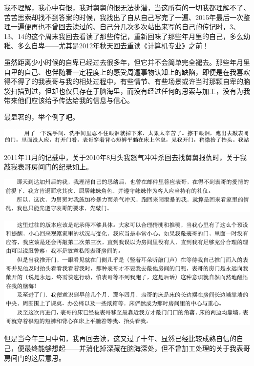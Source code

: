 \documentclass[9pt, b5paper]{article}
\begin{document}
我不理解，我心中有恨，我对舅舅的恨无法排潜，当这所有的一切我都理解不了、苦苦思索却找不到答案的时候，我找出了自从自己写完了一遍、2015年最后一次整理一遍便再也不曾回去读过的、自己分几次多次站出来写的自己的传记时，3、13、14的这个周末我回去看读了那些传记，重新回味了那些年月里的自己，多么幼稚、多么自卑——尤其是2012年秋天回去重读《计算机专业》之前！

虽然距离少小时候的自卑已经过去很多年，但它并不会简单完全褪去。那些年月里自卑的自己、也伴随着一定程度上的感受周遭事物认知上的缺陷，即便是在我喜欢得不得了的我表哥与我的相处过程中，有些情节、有些场景或许当时那颗自卑的脑袋扫描到过，但却也仅只存在于脑海里，而没有经过任何的思索与加工，没有为我带来他们应该给予传达给我的信息与信心。

最显著的，举个例了吧。

\begin{center}
\includegraphics[width=.9\linewidth]{./pic/backups_plans_20210426_161140.png}
\end{center}

2011年11月的记载中，关于2010年8月头我怒气冲冲杀回去找舅舅报仇时，关于我敲我表哥房间门的纪录如上。 

\begin{center}
\includegraphics[width=.9\linewidth]{./pic/backups_plans_20210426_161859.png}
\end{center}

\begin{center}
\includegraphics[width=.9\linewidth]{./pic/backups_plans_20210426_161924.png}
\end{center}

但是当今年三月中旬，我再回去读，这又过了十年、显然已经比较成熟自信的自己，便最终能够想起——并消化掉深藏在脑海深处，但不曾加工处理的关于我表哥房间门的这层意思。
\end{document}
